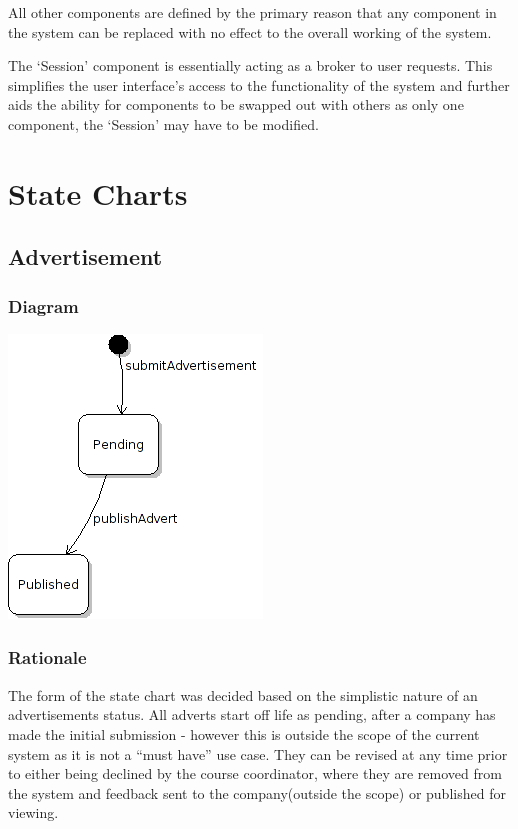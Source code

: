 \documentclass[11pt]{l3deliverable}
\begin{document}
All other components are defined by the primary reason that any component in the 
system can be replaced with no effect to the overall working of the system.

The `Session' component is essentially acting as a broker to user requests. This
simplifies the user interface's access to the functionality of the system and
further aids the ability for components to be swapped out with others as only
one component, the `Session' may have to be modified.

\newpage

\section{State Charts}

\subsection{Advertisement}

\subsubsection{Diagram}

\includegraphics{advertState.png}

\subsubsection{Rationale}

The form of the state chart was decided based on the simplistic nature of an 
advertisements status. All adverts start off life as pending, after a company
has made the initial submission - however this is outside the scope of
the current system as it is not a ``must have'' use case. They can be
revised at any time prior to either being declined by the course
coordinator, where they are removed from the system and feedback sent
to the company(outside the scope) or published for viewing.
\end{document}
